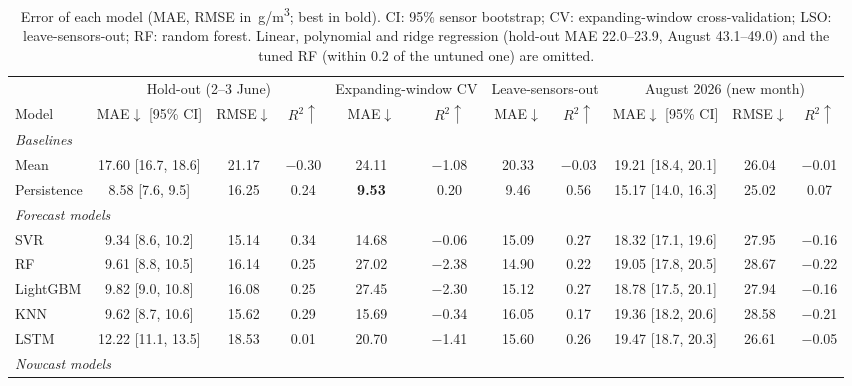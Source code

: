 \documentclass{ieeeaccess}
\newcommand{\ugm}{\textmu g/m\textsuperscript{3}}
\begin{document}
\begin{table}[t]
\caption{Error of each model (MAE, RMSE in~\ugm{}; best in bold). CI: 95\% sensor bootstrap; CV: expanding-window cross-validation; LSO: leave-sensors-out; RF: random forest. Linear, polynomial and ridge regression (hold-out MAE 22.0--23.9, August 43.1--49.0) and the tuned RF (within 0.2 of the untuned one) are omitted.}
\label{tab:results}
\centering
\scriptsize
\setlength{\tabcolsep}{3pt}
\begin{tabular}{lcccccccccc}
\toprule
 & \multicolumn{3}{c}{Hold-out (2--3 June)} & \multicolumn{2}{c}{Expanding-window CV} & \multicolumn{2}{c}{Leave-sensors-out} & \multicolumn{3}{c}{August 2026 (new month)} \\
\cmidrule(lr){2-4}\cmidrule(lr){5-6}\cmidrule(lr){7-8}\cmidrule(lr){9-11}
Model & MAE$\downarrow$ [95\% CI] & RMSE$\downarrow$ & $R^2\uparrow$ & MAE$\downarrow$ & $R^2\uparrow$ & MAE$\downarrow$ & $R^2\uparrow$ & MAE$\downarrow$ [95\% CI] & RMSE$\downarrow$ & $R^2\uparrow$ \\
\midrule
\multicolumn{11}{l}{\textit{Baselines}} \\
Mean & 17.60 {\scriptsize[16.7, 18.6]} & 21.17 & $-$0.30 & 24.11 & $-$1.08 & 20.33 & $-$0.03 & 19.21 {\scriptsize[18.4, 20.1]} & 26.04 & $-$0.01 \\
Persistence & 8.58 {\scriptsize[7.6, 9.5]} & 16.25 & 0.24 & \textbf{9.53} & 0.20 & 9.46 & 0.56 & 15.17 {\scriptsize[14.0, 16.3]} & 25.02 & 0.07 \\
\midrule
\multicolumn{11}{l}{\textit{Forecast models}} \\
SVR & 9.34 {\scriptsize[8.6, 10.2]} & 15.14 & 0.34 & 14.68 & $-$0.06 & 15.09 & 0.27 & 18.32 {\scriptsize[17.1, 19.6]} & 27.95 & $-$0.16 \\
RF & 9.61 {\scriptsize[8.8, 10.5]} & 16.14 & 0.25 & 27.02 & $-$2.38 & 14.90 & 0.22 & 19.05 {\scriptsize[17.8, 20.5]} & 28.67 & $-$0.22 \\
LightGBM & 9.82 {\scriptsize[9.0, 10.8]} & 16.08 & 0.25 & 27.45 & $-$2.30 & 15.12 & 0.27 & 18.78 {\scriptsize[17.5, 20.1]} & 27.94 & $-$0.16 \\
KNN & 9.62 {\scriptsize[8.7, 10.6]} & 15.62 & 0.29 & 15.69 & $-$0.34 & 16.05 & 0.17 & 19.36 {\scriptsize[18.2, 20.6]} & 28.58 & $-$0.21 \\
LSTM & 12.22 {\scriptsize[11.1, 13.5]} & 18.53 & 0.01 & 20.70 & $-$1.41 & 15.60 & 0.26 & 19.47 {\scriptsize[18.7, 20.3]} & 26.61 & $-$0.05 \\
\midrule
\multicolumn{11}{l}{\textit{Nowcast models}} \\

\end{tabular}
\end{table}
\end{document}
